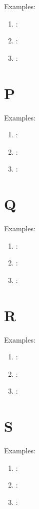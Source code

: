 Examples:
\begin{enumerate}
    \item \textbf{}: \textipa{[]}
    \item \textbf{}: \textipa{[]}
    \item \textbf{}: \textipa{[]}
\end{enumerate}

\section*{P}

Examples:
\begin{enumerate}
    \item \textbf{}: \textipa{[]}
    \item \textbf{}: \textipa{[]}
    \item \textbf{}: \textipa{[]}
\end{enumerate}

\section*{Q}

Examples:
\begin{enumerate}
    \item \textbf{}: \textipa{[]}
    \item \textbf{}: \textipa{[]}
    \item \textbf{}: \textipa{[]}
\end{enumerate}

\section*{R}

Examples:
\begin{enumerate}
    \item \textbf{}: \textipa{[]}
    \item \textbf{}: \textipa{[]}
    \item \textbf{}: \textipa{[]}
\end{enumerate}

\section*{S}

Examples:
\begin{enumerate}
    \item \textbf{}: \textipa{[]}
    \item \textbf{}: \textipa{[]}
    \item \textbf{}: \textipa{[]}
\end{enumerate}

